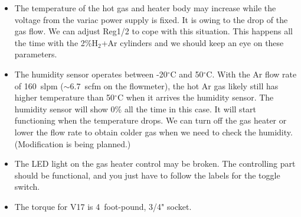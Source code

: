 \documentclass[letterpaper,11pt]{article}
\newcommand{\Hydro}     {H$_2$}
\newcommand{\dC}        {$^\circ$C}
\begin{document}
\begin{itemize}
\item The temperature of the hot gas and heater body may increase while the voltage 
from the variac power supply is fixed.  
It is owing to the drop of the gas flow.  We can adjust Reg1/2 to cope with this situation.
This happens all the time with the 2\%{\Hydro}+Ar cylinders and we should keep an eye on 
these parameters.
\item The humidity sensor operates between -20{\dC} and 50{\dC}.
With the Ar flow rate of 160~slpm ($\sim$6.7~scfm on the flowmeter), the hot Ar gas likely 
still has higher temperature than 50{\dC} when it arrives the humidity sensor.
The humidity sensor will show 0\% all the time in this case.
It will start functioning when the temperature drops.
We can turn off the gas heater or lower the flow rate to obtain colder gas when we need to
check the humidity.
(Modification is being planned.)
\item The LED light on the gas heater control may be broken.  The controlling part 
should be functional, and you just have to follow the labels for the toggle switch.
\item The torque for V17 is 4~foot-pound, 3/4" socket.
\end{itemize}
\end{document}
